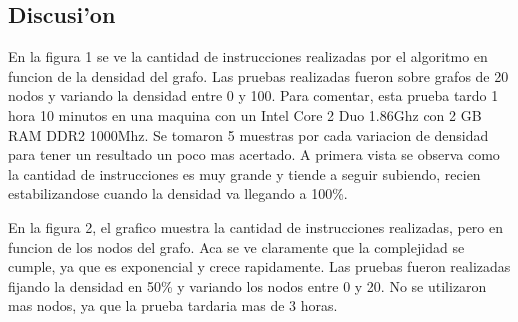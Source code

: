 \subsection{Discusi'on}
En la figura 1 se ve la cantidad de instrucciones realizadas por el algoritmo en funcion de la densidad del grafo. Las pruebas realizadas fueron sobre grafos de 20 nodos y variando la densidad entre 0 y 100. Para comentar, esta prueba tardo 1 hora 10 minutos en una maquina con un Intel Core 2 Duo 1.86Ghz con 2 GB RAM DDR2 1000Mhz. Se tomaron 5 muestras por cada variacion de densidad para tener un resultado un poco mas acertado.
A primera vista se observa como la cantidad de instrucciones es muy grande y tiende a seguir subiendo, recien estabilizandose cuando la densidad va llegando a 100\%.

En la figura 2, el grafico muestra la cantidad de instrucciones realizadas, pero en funcion de los nodos del grafo. Aca se ve claramente que la complejidad se cumple, ya que es exponencial y crece rapidamente. Las pruebas fueron realizadas fijando la densidad en 50\% y variando los nodos entre 0 y 20. No se utilizaron mas nodos, ya que la prueba tardaria mas de 3 horas.

